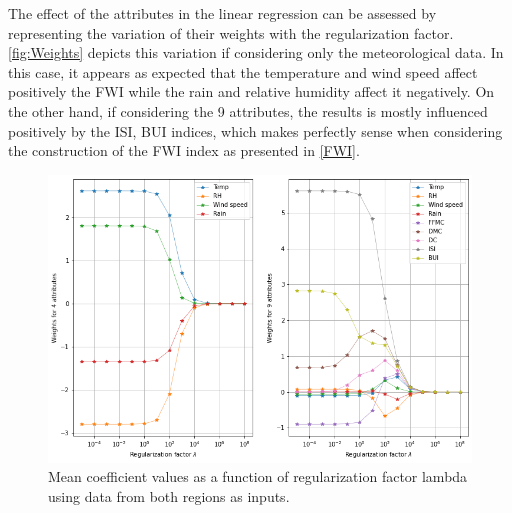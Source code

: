 \documentclass[10pt]{article}
\numberwithin{equation}{section}
\numberwithin{figure}{section}
\numberwithin{table}{section}
\begin{document}
The effect of the attributes in the linear regression can be assessed by representing the variation of their weights with the regularization factor. \autoref{fig:Weights} depicts this variation if considering only the meteorological data. In this case, it appears as expected that the temperature and wind speed affect positively the FWI while the rain and relative humidity affect it negatively. On the other hand, if considering the 9 attributes, the results is mostly influenced positively by the ISI, BUI indices, which makes perfectly sense when considering the construction of the FWI index as presented in \autoref{FWI}.

\begin{figure}[H]
    \centering
    \includegraphics[scale=0.6]{Figures/Weights.png}
    \caption{Mean coefficient values as a function of regularization factor lambda using data from both regions as inputs.}
    \label{fig:Weights}
\end{figure}

\end{document}

